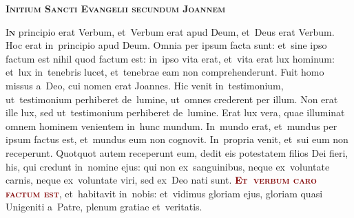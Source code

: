 \documentclass[12pt,a4paper]{scrartcl}
\begin{document}
\thispagestyle{empty}

\pagecolor{fondpaille}
\color{darkgreen}

\begin{center}

    \begin{minipage}{0.7\linewidth}

        \vspace*{3cm}

        \begin{center}
            \scshape\bfseries\Huge
            Initium Sancti Evangelii secundum Joannem
        \end{center}

        \vspace*{0.2cm}

        \LARGE\justify

        \lettrine[lines=3]{\color{Maroon}I}{\bfseries\color{Maroon}n} principio
        erat Verbum, et~Verbum erat apud Deum, et~Deus erat Verbum. Hoc erat
        in~principio apud Deum. Omnia per ipsum facta sunt: et~sine ipso factum
        est nihil quod factum est: in~ipso vita erat, et~vita erat lux hominum:
        et~lux in~tenebris lucet, et~tenebrae eam non comprehenderunt. Fuit homo
        missus a~Deo, cui nomen erat Joannes. Hic venit in~testimonium,
        ut~testimonium perhiberet de~lumine, ut~omnes crederent per illum. Non
        erat ille lux, sed ut~testimonium perhiberet de~lumine. Erat lux vera,
        quae illuminat omnem hominem venientem in~hunc mundum. In~mundo erat,
        et~mundus per ipsum factus est, et~mundus eum non cognovit. In~propria
        venit, et~sui eum non receperunt. Quotquot autem receperunt eum, dedit
        eis potestatem filios Dei fieri, his, qui credunt in~nomine ejus: qui
        non ex~sanguinibus, neque ex~voluntate carnis, neque ex~voluntate viri,
        sed ex~Deo nati sunt.
        \textcolor{Maroon}{\textbf{\textsc{Et~verbum caro factum est}}},
        et~habitavit in~nobis: et~vidimus gloriam ejus, gloriam quasi Unigeniti
        a~Patre, plenum gratiae et~veritatis.
    \end{minipage}
\end{center}

\vspace*{1cm}
\end{document}
